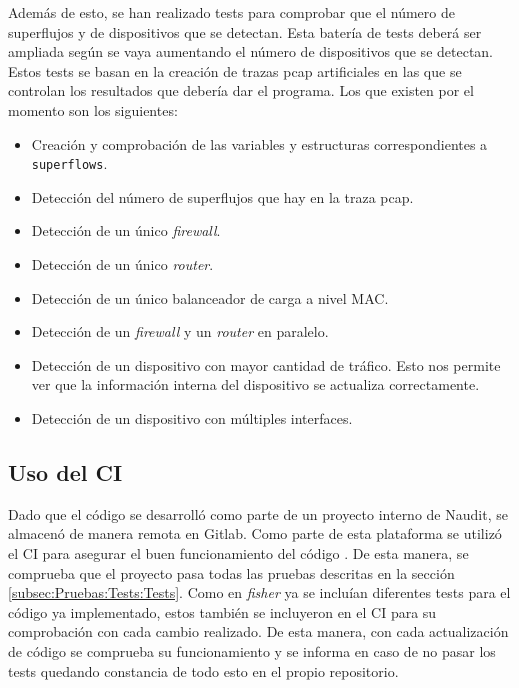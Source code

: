 \documentclass[twoside, 12pt]{epstfg}
\begin{document}
Además de esto, se han realizado tests para comprobar que el número de superflujos y de dispositivos que se detectan. Esta batería de tests deberá ser ampliada según se vaya aumentando el número de dispositivos que se detectan. Estos tests se basan en la creación de trazas pcap artificiales en las que se controlan los resultados que debería dar el programa. Los que existen por el momento son los siguientes:

\begin{itemize}
    \item Creación y comprobación de las variables y estructuras correspondientes a \texttt{superflows}.
    \item Detección del número de superflujos que hay en la traza pcap. 
    \item Detección de un único \textit{firewall}.
    \item Detección de un único \textit{router}.
    \item Detección de un único balanceador de carga a nivel MAC.
    \item Detección de un \textit{firewall} y un \textit{router} en paralelo.
    \item Detección de un dispositivo con mayor cantidad de tráfico. Esto nos permite ver que la información interna del dispositivo se actualiza correctamente.
    \item Detección de un dispositivo con múltiples interfaces.
\end{itemize}

\subsection{Uso del CI}
Dado que el código se desarrolló como parte de un proyecto interno de Naudit, se almacenó de manera remota en Gitlab. Como parte de esta plataforma se utilizó el CI para asegurar el buen funcionamiento del código \cite{GitLabDocs2019}. De esta manera, se comprueba que el proyecto pasa todas las pruebas descritas en la sección \ref{subsec:Pruebas:Tests:Tests}. Como en \textit{fisher} ya se incluían diferentes tests para el código ya implementado, estos también se incluyeron en el CI para su comprobación con cada cambio realizado. De esta manera, con cada actualización de código se comprueba su funcionamiento y se informa en caso de no pasar los tests quedando constancia de todo esto en el propio repositorio.
\end{document}
